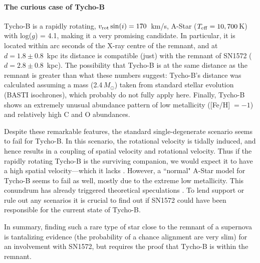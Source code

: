 \documentclass[12pt]{article}
\begin{document}
\vspace{-5mm}
\paragraph{The curious case of Tycho-B}
Tycho-B is a rapidly rotating, $v_{{\rm rot}}\, {\rm sin}(i)=170$~km/s, A-Star ($T_{\rm eff}=10,700$\,K) with  log($g$) = 4.1, making it a very promising candidate. In particular,  it is located within arc seconds of the X-ray centre of the remnant, and at $d = 1.8\pm 0.8$~kpc its distance is compatible (just) with the remnant of SN1572 ($d = 2.8\pm0.8$~kpc). The possibility that Tycho-B is at the same distance as the remnant is greater than what these numbers suggest: Tycho-B's distance was calculated assuming a mass (2.4\,$M_\odot$) taken from standard stellar evolution (BASTI isochrones), which probably do not fully apply here. Finally, Tycho-B shows an extremely unusual abundance pattern of low metallicity ([Fe/H]$\; =-1$) and relatively high C and O abundances.

Despite these remarkable features, the standard single-degenerate scenario seems to fail \citep{2012arXiv1210.2713K} for Tycho-B.  In this scenario, the rotational velocity is tidally induced, and hence  results in a coupling of spatial velocity and rotational velocity.  Thus if the rapidly rotating Tycho-B is the surviving companion, we would  expect it to have a high spatial velocity---which it lacks \citep[both in radial velocity and proper motion][]{2012arXiv1210.2713K}.
However, a ``normal" A-Star model for Tycho-B seems to fail as well, mostly due to the extreme low metallicity. This conundrum has already triggered theoretical speculations \citep[e.g.][]{2012arXiv1212.2662T}. To lend support or rule out any scenarios it is crucial to find out if SN1572 could have been responsible for the current state of Tycho-B.

In summary, finding such a rare type of star close to the remnant of a supernova is tantalizing evidence (the probability of a chance alignment are very slim) for an involvement with SN1572, but requires the proof that Tycho-B is within the remnant.

\vspace{-5mm}
\end{document}

